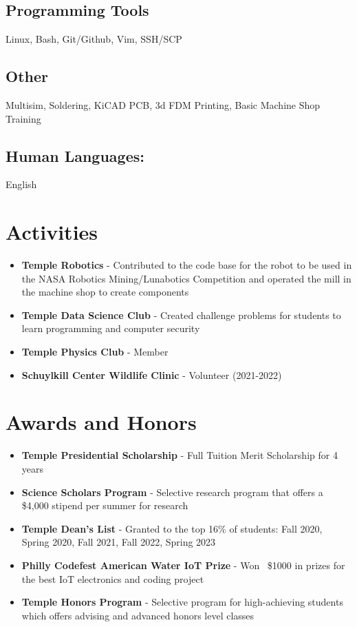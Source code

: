 \documentclass[letterpaper,11pt]{article}
\begin{document}
\subsection{Programming Tools}
Linux, Bash, Git/Github, Vim, SSH/SCP
\subsection{Other} Multisim, Soldering, KiCAD PCB, 3d FDM Printing, Basic Machine Shop Training
\subsection{Human Languages:}
English

\section{Activities}
\begin{itemize}
    \item \textbf{Temple Robotics} - Contributed to the code base for the robot to be used in the NASA Robotics Mining/Lunabotics Competition and operated the mill in the machine shop to create components
    \item \textbf{Temple Data Science Club} - Created challenge problems for students to learn programming and computer security
    \item \textbf{Temple Physics Club} - Member
    \item \textbf{Schuylkill Center Wildlife Clinic} - Volunteer (2021-2022)
\end{itemize}


\section{Awards and Honors}
\begin{itemize}
    \item \textbf{Temple Presidential Scholarship} - Full Tuition Merit Scholarship for 4 years
    \item \textbf{Science Scholars Program} - Selective research program that offers a \$4,000 stipend per summer for research
    \item \textbf{Temple Dean's List} - Granted to the top 16\% of students: Fall 2020, Spring 2020, Fall 2021, Fall 2022, Spring 2023
    \item \textbf{Philly Codefest American Water IoT Prize} - Won ~\$1000 in prizes for the best IoT electronics and coding project
    \item \textbf{Temple Honors Program} - Selective program for high-achieving students which offers advising and advanced honors level classes
\end{itemize}
\end{document}
